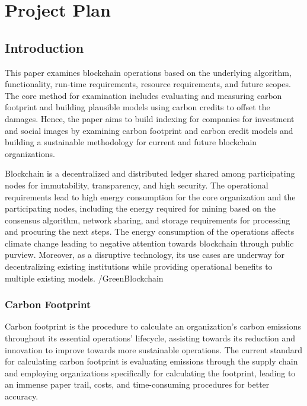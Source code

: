 \documentclass[11pt, a4paper]{article}
\begin{document}
\newpage 

\section*{Project Plan}

\subsection*{Introduction}
This paper examines blockchain operations based on the underlying algorithm, functionality, run-time requirements, resource requirements, and future scopes. The core method for examination includes evaluating and measuring carbon footprint and building plausible models using carbon credits to offset the damages. Hence, the paper aims to build indexing for companies for investment and social images by examining carbon footprint and carbon credit models and building a sustainable methodology for current and future blockchain organizations. 

Blockchain is a decentralized and distributed ledger shared among participating nodes for immutability, transparency, and high security. The operational requirements lead to high energy consumption for the core organization and the participating nodes, including the energy required for mining based on the consensus algorithm, network sharing, and storage requirements for processing and procuring the next steps. The energy consumption of the operations affects climate change leading to negative attention towards blockchain through public purview. Moreover, as a disruptive technology, its use cases are underway for decentralizing existing institutions while providing operational benefits to multiple existing models. /GreenBlockchain

\subsubsection*{Carbon Footprint} 

Carbon footprint is the procedure to calculate an organization's carbon emissions throughout its essential operations' lifecycle, assisting towards its reduction and innovation to improve towards more sustainable operations. The current standard for calculating carbon footprint is evaluating emissions through the supply chain and employing organizations specifically for calculating the footprint, leading to an immense paper trail, costs, and time-consuming procedures for better accuracy. \cite{hu_framework_2019}
\end{document}

